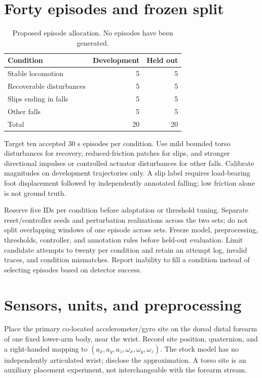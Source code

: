 \section{Forty episodes and frozen split}
\begin{table}[htbp]
\centering\caption{Proposed episode allocation. No episodes have been generated.}
\begin{tabular}{@{}p{7cm}rr@{}}\toprule
Condition & Development & Held out\\\midrule
Stable locomotion & 5 & 5\\
Recoverable disturbances & 5 & 5\\
Slips ending in falls & 5 & 5\\
Other falls & 5 & 5\\\midrule
Total & 20 & 20\\\bottomrule
\end{tabular}
\end{table}
Target ten accepted 30 s episodes per condition. Use mild bounded torso disturbances for recovery, reduced-friction patches for slips, and stronger directional impulses or controlled actuator disturbances for other falls. Calibrate magnitudes on development trajectories only. A slip label requires load-bearing foot displacement followed by independently annotated falling; low friction alone is not ground truth.

Reserve five IDs per condition before adaptation or threshold tuning. Separate reset/controller seeds and perturbation realizations across the two sets; do not split overlapping windows of one episode across sets. Freeze model, preprocessing, thresholds, controller, and annotation rules before held-out evaluation. Limit candidate attempts to twenty per condition and retain an attempt log, invalid traces, and condition mismatches. Report inability to fill a condition instead of selecting episodes based on detector success.

\section{Sensors, units, and preprocessing}
Place the primary co-located accelerometer/gyro site on the dorsal distal forearm of one fixed lower-arm body, near the wrist. Record site position, quaternion, and a right-handed mapping to $(a_x,a_y,a_z,\omega_x,\omega_y,\omega_z)$. The stock model has no independently articulated wrist; disclose the approximation. A torso site is an auxiliary placement experiment, not interchangeable with the forearm stream.

